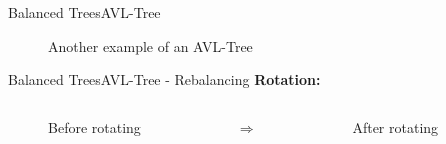 
\begin{frame}{Balanced Trees}{AVL-Tree}
  \begin{figure}
    \begin{adjustbox}{width=0.75\linewidth}
      
    \end{adjustbox}
    \caption{Another example of an AVL-Tree}
    \label{fig:balanced_trees:avl_tree_example3}
  \end{figure}
\end{frame}


\begin{frame}{Balanced Trees}{AVL-Tree - Rebalancing}
  \textbf{Rotation:}
  \vspace{-2.5em}
  \begin{columns}
    \begin{column}{0.35\linewidth}
      \begin{figure}
        \begin{adjustbox}{width=0.9\linewidth}
          
        \end{adjustbox}
        \vspace{-0.5em}
        \caption{Before rotating}
        \label{fig:balanced_trees:avl_tree_rotate_1}
      \end{figure}
    \end{column}
    \begin{column}{0.1\linewidth}
      \begin{center}
        $\Rightarrow$
      \end{center}
    \end{column}
    \begin{column}{0.35\linewidth}
      \begin{figure}
        \begin{adjustbox}{width=0.9\linewidth}
          
        \end{adjustbox}
        \vspace{-0.5em}
        \caption{After rotating}
        \label{fig:balanced_trees:avl_tree_rotate_2}
      \end{figure}
    \end{column}
   \end{columns}

\end{frame}
